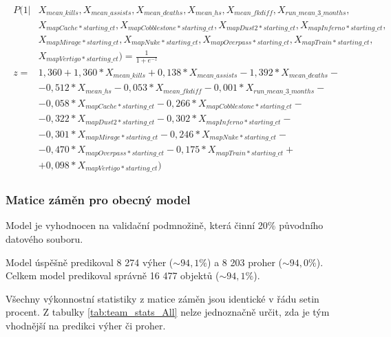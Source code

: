 \begin{align}
    \begin{split}
        P(1 | &X_{mean\_kills}, X_{mean\_assists}, X_{mean\_deaths}, X_{mean\_hs}, X_{mean\_fkdiff}, X_{run\_mean\_3\_months}, \\
              &X_{mapCache*starting\_ct}, X_{mapCobblestone*starting\_ct}, X_{mapDust2*starting\_ct}, X_{mapInferno*starting\_ct}, \\
              &X_{mapMirage*starting\_ct}, X_{mapNuke*starting\_ct}, X_{mapOverpass*starting\_ct}, X_{mapTrain*starting\_ct}, \\
              &X_{mapVertigo*starting\_ct}) = \frac{1}{1 + e^{-z}} \\
        z = &1,360 + 1,360*X_{mean\_kills} + 0,138*X_{mean\_assists} - 1,392*X_{mean\_deaths} - \\
            &- 0,512*X_{mean\_hs} -  0,053*X_{mean\_fkdiff} -0,001*X_{run\_mean\_3\_months} - \\
            &- 0,058*X_{mapCache*starting\_ct} - 0,266*X_{mapCobblestone*starting\_ct} - \\
            &- 0,322*X_{mapDust2*starting\_ct} - 0,302*X_{mapInferno*starting\_ct} - \\
            & -0,301*X_{mapMirage*starting\_ct} - 0,246*X_{mapNuke*starting\_ct} - \\
            &- 0,470*X_{mapOverpass*starting\_ct} - 0,175*X_{mapTrain*starting\_ct} + \\
            &+ 0,098*X_{mapVertigo*starting\_ct})
    \end{split}
\end{align}

\subsubsection{Matice záměn pro obecný model}
Model je vyhodnocen na validační podmnožině, která činní 20\% původního datového souboru.



Model úspěšně predikoval 8 274 výher ($\sim 94,1\%$) a 8 203 proher ($\sim 94,0\%$). Celkem model predikoval správně 16 477 objektů ($\sim 94,1\%$).



Všechny výkonnostní statistiky z matice záměn jsou identické v řádu setin procent. Z tabulky \ref{tab:team_stats_All} nelze jednoznačně určit, zda je tým
vhodnější na predikci výher či proher.

